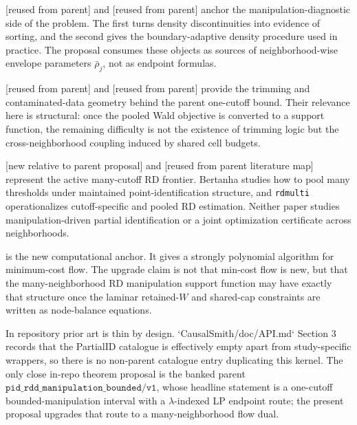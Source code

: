 \documentclass[11pt]{article}
\theoremstyle{definition}
\theoremstyle{plain}
\theoremstyle{remark}
\begin{document}
\citet{McCrary2008} [reused from parent] and \citet{CattaneoJanssonMa2020} [reused from parent]
anchor the manipulation-diagnostic side of the problem. The first turns density discontinuities
into evidence of sorting, and the second gives the boundary-adaptive density procedure used in
practice. The proposal consumes these objects as sources of neighborhood-wise envelope parameters
\(\bar\rho_j\), not as endpoint formulas.

\citet{Lee2009} [reused from parent] and \citet{HorowitzManski1995} [reused from parent]
provide the trimming and contaminated-data geometry behind the parent one-cutoff bound. Their
relevance here is structural: once the pooled Wald objective is converted to a support function,
the remaining difficulty is not the existence of trimming logic but the cross-neighborhood
coupling induced by shared cell budgets.

\citet{Bertanha2020} [new relative to parent proposal] and
\citet{CattaneoTitiunikVazquezBare2020} [reused from parent literature map] represent the
active many-cutoff RD frontier. Bertanha studies how to pool many thresholds under maintained
point-identification structure, and \texttt{rdmulti} operationalizes cutoff-specific and pooled
RD estimation. Neither paper studies manipulation-driven partial identification or a joint
optimization certificate across neighborhoods.

\citet{Orlin1993} is the new computational anchor. It gives a strongly polynomial algorithm for
minimum-cost flow. The upgrade claim is not that min-cost flow is new, but that the many-neighborhood
RD manipulation support function may have exactly that structure once the laminar retained-\(W\)
and shared-cap constraints are written as node-balance equations.

In repository prior art is thin by design. `CausalSmith/doc/API.md` Section 3 records that the
PartialID catalogue is effectively empty apart from study-specific wrappers, so there is no
non-parent catalogue entry duplicating this kernel. The only close in-repo theorem proposal is
the banked parent \(\texttt{pid\_rdd\_manipulation\_bounded}/\texttt{v1}\), whose headline
statement is a one-cutoff bounded-manipulation interval with a \(\lambda\)-indexed LP endpoint
route; the present proposal upgrades that route to a many-neighborhood flow dual.
\end{document}
